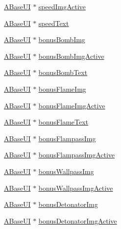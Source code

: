 \begin{DoxyCompactItemize}
\item 
\hyperlink{class_a_base_u_i}{A\+Base\+UI} $\ast$ \hyperlink{struct_scene_game_1_1_all_u_i_a1242c13648a9edf01a598a2424c15671}{speed\+Img\+Active}
\item 
\hyperlink{class_a_base_u_i}{A\+Base\+UI} $\ast$ \hyperlink{struct_scene_game_1_1_all_u_i_a201440cdeb7757552c7eefc062ab4be1}{speed\+Text}
\item 
\hyperlink{class_a_base_u_i}{A\+Base\+UI} $\ast$ \hyperlink{struct_scene_game_1_1_all_u_i_a9aa14511898a0fe3cbf9a031d59bb634}{bonus\+Bomb\+Img}
\item 
\hyperlink{class_a_base_u_i}{A\+Base\+UI} $\ast$ \hyperlink{struct_scene_game_1_1_all_u_i_a2252e9123bcecbb0929ba648d6a29092}{bonus\+Bomb\+Img\+Active}
\item 
\hyperlink{class_a_base_u_i}{A\+Base\+UI} $\ast$ \hyperlink{struct_scene_game_1_1_all_u_i_a163fc9f7d830e6cd30239702e1f45001}{bonus\+Bomb\+Text}
\item 
\hyperlink{class_a_base_u_i}{A\+Base\+UI} $\ast$ \hyperlink{struct_scene_game_1_1_all_u_i_a5580c42156de8daa2a52163ae45f6f62}{bonus\+Flame\+Img}
\item 
\hyperlink{class_a_base_u_i}{A\+Base\+UI} $\ast$ \hyperlink{struct_scene_game_1_1_all_u_i_a0e924e7c6ab58ca33e486510e1c13780}{bonus\+Flame\+Img\+Active}
\item 
\hyperlink{class_a_base_u_i}{A\+Base\+UI} $\ast$ \hyperlink{struct_scene_game_1_1_all_u_i_ac6eb893410813cf29ac85e18ca8633eb}{bonus\+Flame\+Text}
\item 
\hyperlink{class_a_base_u_i}{A\+Base\+UI} $\ast$ \hyperlink{struct_scene_game_1_1_all_u_i_a6a4514d89913d9685692795e77b5d90d}{bonus\+Flampass\+Img}
\item 
\hyperlink{class_a_base_u_i}{A\+Base\+UI} $\ast$ \hyperlink{struct_scene_game_1_1_all_u_i_aa8df7d907e0833754ea2f6940bfc2d50}{bonus\+Flampass\+Img\+Active}
\item 
\hyperlink{class_a_base_u_i}{A\+Base\+UI} $\ast$ \hyperlink{struct_scene_game_1_1_all_u_i_a52beff4ad9032157fcb2964125e9cb01}{bonus\+Wallpass\+Img}
\item 
\hyperlink{class_a_base_u_i}{A\+Base\+UI} $\ast$ \hyperlink{struct_scene_game_1_1_all_u_i_aba72334a56761068f2b5d2b529958d81}{bonus\+Wallpass\+Img\+Active}
\item 
\hyperlink{class_a_base_u_i}{A\+Base\+UI} $\ast$ \hyperlink{struct_scene_game_1_1_all_u_i_ad71d068023d85eac60f8bd6a97704b15}{bonus\+Detonator\+Img}
\item 
\hyperlink{class_a_base_u_i}{A\+Base\+UI} $\ast$ \hyperlink{struct_scene_game_1_1_all_u_i_a9655ccc38e9c51a927c10ed285111a3c}{bonus\+Detonator\+Img\+Active}

\end{DoxyCompactItemize}
